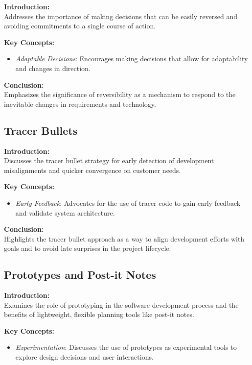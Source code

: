 \textbf{Introduction:} \\
Addresses the importance of making decisions that can be easily reversed and avoiding commitments to a single course of action.

\vspace{2mm}
\noindent\textbf{Key Concepts:}
\begin{itemize}
  \item \textit{Adaptable Decisions}: Encourages making decisions that allow for adaptability and changes in direction.
\end{itemize}

\vspace{2mm}
\noindent\textbf{Conclusion:} \\
Emphasizes the significance of reversibility as a mechanism to respond to the inevitable changes in requirements and technology.

\subsection{Tracer Bullets}

\textbf{Introduction:} \\
Discusses the tracer bullet strategy for early detection of development misalignments and quicker convergence on customer needs.

\vspace{2mm}
\noindent\textbf{Key Concepts:}
\begin{itemize}
  \item \textit{Early Feedback}: Advocates for the use of tracer code to gain early feedback and validate system architecture.
\end{itemize}

\vspace{2mm}
\noindent\textbf{Conclusion:} \\
Highlights the tracer bullet approach as a way to align development efforts with goals and to avoid late surprises in the project lifecycle.

\subsection{Prototypes and Post-it Notes}

\textbf{Introduction:} \\
Examines the role of prototyping in the software development process and the benefits of lightweight, flexible planning tools like post-it notes.

\vspace{2mm}
\noindent\textbf{Key Concepts:}
\begin{itemize}
  \item \textit{Experimentation}: Discusses the use of prototypes as experimental tools to explore design decisions and user interactions.
\end{itemize}

